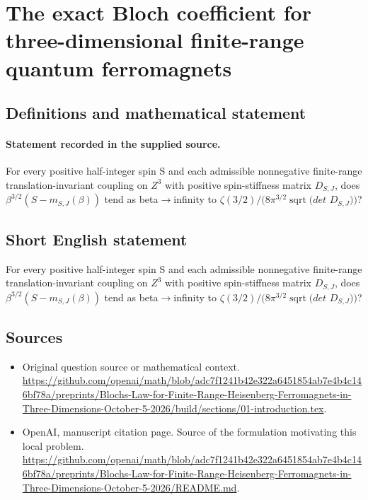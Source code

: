 \documentclass[11pt]{article}
\begin{document}
\section*{The exact Bloch coefficient for three-dimensional finite-range quantum ferromagnets}\label{statement}
\subsection{Definitions and mathematical statement}
\paragraph{Statement recorded in the supplied source.}
For every positive half-integer spin S and each admissible nonnegative finite-range translation-invariant coupling on $Z^3$ with positive spin-stiffness matrix $D_{S,J}$, does $\beta ^{3/2}(S-m_{S,J}(\beta ))$ tend as beta$\to$infinity to $\zeta (3/2)/(8\pi ^{3/2}\operatorname{sqrt}(det$ $D_{S,J}))$?
\subsection{Short English statement}
For every positive half-integer spin S and each admissible nonnegative finite-range translation-invariant coupling on $Z^3$ with positive spin-stiffness matrix $D_{S,J}$, does $\beta ^{3/2}(S-m_{S,J}(\beta ))$ tend as beta$\to$infinity to $\zeta (3/2)/(8\pi ^{3/2}\operatorname{sqrt}(det$ $D_{S,J}))$?
\subsection{Sources}
\begin{itemize}
\item[S1] Original question source or mathematical context.
\url{https://github.com/openai/math/blob/adc7f1241b42e322a6451854ab7e4b4c146bf78a/preprints/Blochs-Law-for-Finite-Range-Heisenberg-Ferromagnets-in-Three-Dimensions-October-5-2026/build/sections/01-introduction.tex}.
\item[S2] OpenAI, manuscript citation page. Source of the formulation motivating this local problem.
\url{https://github.com/openai/math/blob/adc7f1241b42e322a6451854ab7e4b4c146bf78a/preprints/Blochs-Law-for-Finite-Range-Heisenberg-Ferromagnets-in-Three-Dimensions-October-5-2026/README.md}.
\end{itemize}
\end{document}
